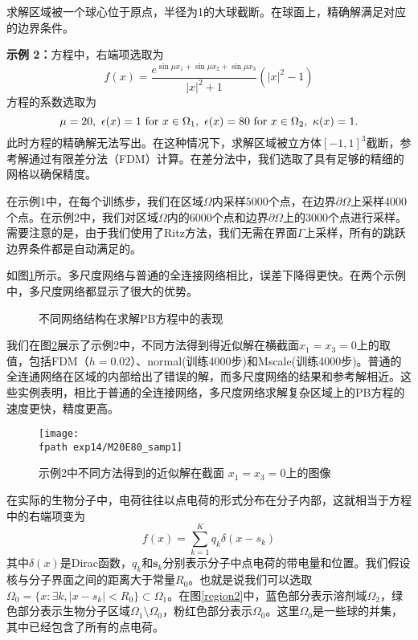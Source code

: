 求解区域被一个球心位于原点，半径为1的大球截断。在球面上，精确解满足对应的边界条件。

\textbf{示例 2：}方程中，右端项选取为
\begin{equation}
f(x) = \frac{e^{\sin \mu x_1 + \sin \mu x_2 + \sin \mu x_3}}{|x|^2 + 1} (|x|^2 - 1)
\end{equation}
方程的系数选取为
\begin{equation}
\mu = 20, \ \epsilon(x) = 1 \ {\rm for}\ x\in\Omega_1, \  \epsilon(x) = 80 \ {\rm for}\ x\in\Omega_2,\ \kappa(x) = 1.
\end{equation}
此时方程的精确解无法写出。在这种情况下，求解区域被立方体$[-1,1]^3$截断，参考解通过有限差分法（FDM）计算。在差分法中，我们选取了具有足够的精细的网格以确保精度。

在示例1中，在每个训练步，我们在区域$\Omega$内采样$5000$个点，在边界$\partial\Omega$上采样$4000$个点。在示例2中，我们对区域$\Omega$内的$6000$个点和边界$\partial\Omega$上的$3000$个点进行采样。需要注意的是，由于我们使用了Ritz方法，我们无需在界面$\Gamma$上采样，所有的跳跃边界条件都是自动满足的。

如图\ref{e14}所示。多尺度网络与普通的全连接网络相比，误差下降得更快。在两个示例中，多尺度网络都显示了很大的优势。
\begin{figure}[htbp]
\centering
{}
\caption{不同网络结构在求解PB方程中的表现}
\label{e14}
\end{figure}

我们在图\ref{e9f}展示了示例2中，不同方法得到得近似解在横截面$x_1 = x_3 = 0$上的取值，包括FDM（$h=0.02$）、normal(训练4000步)和Mscale(训练4000步)。普通的全连通网络在区域的内部给出了错误的解，而多尺度网络的结果和参考解相近。这些实例表明，相比于普通的全连接网络，多尺度网络求解复杂区域上的PB方程的速度更快，精度更高。

\begin{figure}[htbp]
\centering
\texttt{[image: \\fpath exp14/M20E80\_samp1]}
\caption{示例2中不同方法得到的近似解在截面 $x_1 = x_3 = 0$上的图像}
\label{e9f}
\end{figure}


在实际的生物分子中，电荷往往以点电荷的形式分布在分子内部，这就相当于方程中的右端项变为
\begin{equation}
f(x) = \sum_{k=1}^{K} q_k \delta(x - s_k)
\end{equation}
其中$\delta(x)$是Dirac函数，$q_k$和$\mathbf{s}_k$分别表示分子中点电荷的带电量和位置。我们假设核与分子界面之间的距离大于常量$R_0$。也就是说我们可以选取$\Omega_0=\{x:\exists k, | x-s_k|<R_0\}\subset\Omega_1$。在图\ref{region2}中，蓝色部分表示溶剂域$\Omega_2$，绿色部分表示生物分子区域$\Omega_1\setminus\Omega_0$，粉红色部分表示$\Omega_0$。这里$\Omega_0$是一些球的并集，其中已经包含了所有的点电荷。

